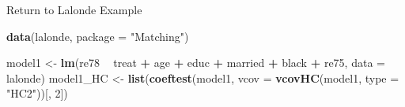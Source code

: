 \documentclass[ignorenonframetext,]{beamer}
\newenvironment{Shaded}{\begin{snugshade}}{\end{snugshade}}
\newcommand{\KeywordTok}[1]{\textcolor[rgb]{0.13,0.29,0.53}{\textbf{#1}}}
\newcommand{\DataTypeTok}[1]{\textcolor[rgb]{0.13,0.29,0.53}{#1}}
\newcommand{\DecValTok}[1]{\textcolor[rgb]{0.00,0.00,0.81}{#1}}
\newcommand{\StringTok}[1]{\textcolor[rgb]{0.31,0.60,0.02}{#1}}
\newcommand{\OperatorTok}[1]{\textcolor[rgb]{0.81,0.36,0.00}{\textbf{#1}}}
\newcommand{\NormalTok}[1]{#1}
\begin{document}
\begin{frame}[fragile]{Return to Lalonde Example}

\begin{Shaded}
\begin{Highlighting}[]
\KeywordTok{data}\NormalTok{(lalonde, }\DataTypeTok{package =} \StringTok{"Matching"}\NormalTok{)}
\end{Highlighting}
\end{Shaded}

\small

\begin{Shaded}
\begin{Highlighting}[]
\NormalTok{model1 <-}\StringTok{ }\KeywordTok{lm}\NormalTok{(re78 }\OperatorTok{~}\StringTok{ }\NormalTok{treat }\OperatorTok{+}\StringTok{ }\NormalTok{age }\OperatorTok{+}\StringTok{ }\NormalTok{educ }\OperatorTok{+}\StringTok{ }\NormalTok{married }\OperatorTok{+}\StringTok{ }\NormalTok{black }\OperatorTok{+}\StringTok{ }\NormalTok{re75, }\DataTypeTok{data =}\NormalTok{ lalonde)}
\NormalTok{model1_HC <-}\StringTok{ }\KeywordTok{list}\NormalTok{(}\KeywordTok{coeftest}\NormalTok{(model1, }
                           \DataTypeTok{vcov =} \KeywordTok{vcovHC}\NormalTok{(model1, }\DataTypeTok{type =} \StringTok{"HC2"}\NormalTok{))[, }\DecValTok{2}\NormalTok{])}
\end{Highlighting}
\end{Shaded}

\normalsize

\tiny


\end{frame}
\end{document}
